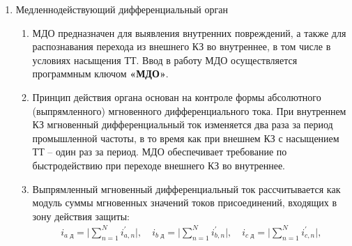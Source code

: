 \begin{enumerate}
\item Медленнодействующий дифференциальный орган
\begin{enumerate}
\item МДО предназначен для выявления внутренних повреждений, а также для распознавания перехода из внешнего КЗ во внутреннее, в том числе в условиях насыщения ТТ. Ввод в работу МДО осуществляется программным ключом \textbf{«МДО»}.
\item Принцип действия органа основан на контроле формы абсолютного (выпрямленного) мгновенного дифференциального тока. При внутреннем КЗ мгновенный дифференциальный ток изменяется два раза за период промышленной частоты, в то время как при внешнем КЗ с насыщением ТТ – один раз за период. МДО обеспечивает требование по быстродействию при переходе внешнего КЗ во внутреннее.
\item Выпрямленный мгновенный дифференциальный ток рассчитывается как модуль суммы мгновенных значений токов присоединений, входящих в зону действия защиты:
  \begin{align}
    i_\textit{a д}=\mid \sum_{n=1}^N i_{a, n}^{'} \mid,\quad
    i_\textit{b д}=\mid \sum_{n=1}^N i_{b, n}^{'} \mid,\quad
    i_\textit{c д}=\mid \sum_{n=1}^N i_{c, n}^{'} \mid,
  \end{align}
\end{enumerate}


\end{enumerate}
